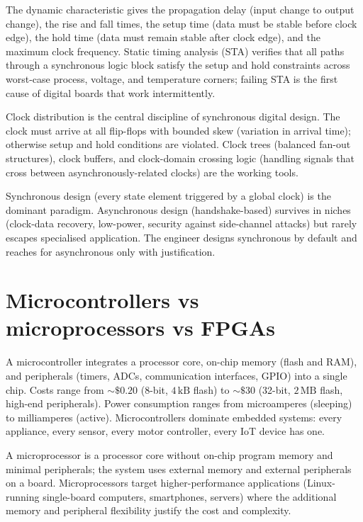 The dynamic characteristic gives the propagation delay (input change to output change), the rise and fall times, the setup time (data must be stable before clock edge), the hold time (data must remain stable after clock edge), and the maximum clock frequency. Static timing analysis (STA) verifies that all paths through a synchronous logic block satisfy the setup and hold constraints across worst-case process, voltage, and temperature corners; failing STA is the first cause of digital boards that work intermittently.

Clock distribution is the central discipline of synchronous digital design. The clock must arrive at all flip-flops with bounded skew (variation in arrival time); otherwise setup and hold conditions are violated. Clock trees (balanced fan-out structures), clock buffers, and clock-domain crossing logic (handling signals that cross between asynchronously-related clocks) are the working tools.

Synchronous design (every state element triggered by a global clock) is the dominant paradigm. Asynchronous design (handshake-based) survives in niches (clock-data recovery, low-power, security against side-channel attacks) but rarely escapes specialised application. The engineer designs synchronous by default and reaches for asynchronous only with justification.

\section{Microcontrollers vs microprocessors vs FPGAs}

A microcontroller integrates a processor core, on-chip memory (flash and RAM), and peripherals (timers, ADCs, communication interfaces, GPIO) into a single chip. Costs range from $\sim\$0.20$ (8-bit, $4\,\text{kB}$ flash) to $\sim\$30$ (32-bit, $2\,\text{MB}$ flash, high-end peripherals). Power consumption ranges from microamperes (sleeping) to milliamperes (active). Microcontrollers dominate embedded systems: every appliance, every sensor, every motor controller, every IoT device has one.

A microprocessor is a processor core without on-chip program memory and minimal peripherals; the system uses external memory and external peripherals on a board. Microprocessors target higher-performance applications (Linux-running single-board computers, smartphones, servers) where the additional memory and peripheral flexibility justify the cost and complexity.

